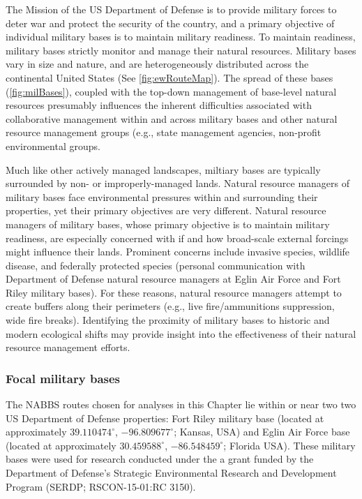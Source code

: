 \documentclass[12pt,twoside,openany]{reedthesis}
\begin{document}
The Mission of the US Department of Defense is to provide military
forces to deter war and protect the security of the country, and a
primary objective of individual military bases is to maintain military
readiness. To maintain readiness, military bases strictly monitor and
manage their natural resources. Military bases vary in size and nature,
and are heterogeneously distributed across the continental United States
(See \ref{fig:ewRouteMap}). The spread of these bases
(\ref{fig:milBases}), coupled with the top-down management of base-level
natural resources presumably influences the inherent difficulties
associated with collaborative management within and across military
bases and other natural resource management groups (e.g., state
management agencies, non-profit environmental groups.

Much like other actively managed landscapes, miltiary bases are
typically surrounded by non- or improperly-managed lands. Natural
resource managers of military bases face environmental pressures within
and surrounding their properties, yet their primary objectives are very
different. Natural resource managers of military bases, whose primary
objective is to maintain military readiness, are especially concerned
with if and how broad-scale external forcings might influence their
lands. Prominent concerns include invasive species, wildlife disease,
and federally protected species (personal communication with Department
of Defense natural resource managers at Eglin Air Force and Fort Riley
military bases). For these reasons, natural resource managers attempt to
create buffers along their perimeters (e.g., live fire/ammunitions
suppression, wide fire breaks). Identifying the proximity of military
bases to historic and modern ecological shifts may provide insight into
the effectiveness of their natural resource management efforts.

\subsubsection{Focal military bases}\label{focal-military-bases}

The NABBS routes chosen for analyses in this Chapter lie within or near
two two US Department of Defense properties: Fort Riley military base
(located at approximately \(39.110474^{\circ}\), \(-96.809677^{\circ}\);
Kansas, USA) and Eglin Air Force base (located at approximately
\(30.459588^{\circ}\), \(-86.548459^{\circ}\); Florida USA). These
military bases were used for research conducted under the a grant funded
by the Department of Defense's Strategic Environmental Research and
Development Program (SERDP; RSCON-15-01:RC 3150).
\end{document}
